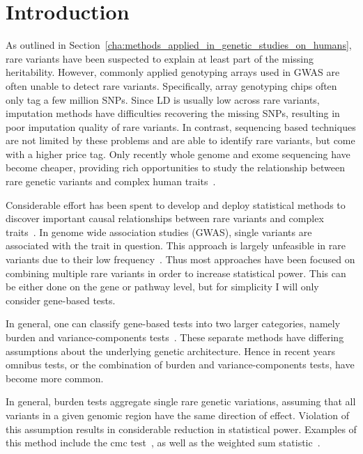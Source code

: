 \section{Introduction}
\label{sec:introduction_ksburden}

As outlined in Section~\ref{cha:methods_applied_in_genetic_studies_on_humans}, rare variants have been suspected to explain at least part of the missing heritability.
However, commonly applied genotyping arrays used in GWAS are often unable to detect rare variants.
Specifically, array genotyping chips often only tag a few million SNPs.
Since LD is usually low across rare variants, imputation methods have difficulties recovering the missing SNPs, resulting in poor imputation quality of rare variants.
In contrast, sequencing based techniques are not limited by these problems and are able to identify rare variants, but come with a higher price tag.
Only recently whole genome and exome sequencing have become cheaper, providing rich opportunities to study the relationship between rare genetic variants and complex human traits~\cite{Goodwin2016}.

Considerable effort has been spent to develop and deploy statistical methods to discover important causal relationships between rare variants and complex traits~\cite{Morris2010,Zeng2014,Daye2012,Manuscript2013}.
In genome wide association studies (GWAS), single variants are associated with the trait in question.
This approach is largely unfeasible in rare variants due to their low frequency~\cite{Lee2014}.
Thus most approaches have been focused on combining multiple rare variants in order to increase statistical power.
This can be either done on the gene or pathway level, but for simplicity I will only consider gene-based tests.

In general, one can classify gene-based tests into two larger categories, namely burden and variance-components tests~\cite{Lee2014}.
These separate methods have differing assumptions about the underlying genetic architecture.
Hence in recent years omnibus tests, or the combination of burden and variance-components tests, have become more common.

In general, burden tests aggregate single rare genetic variations, assuming that all variants in a given genomic region have the same direction of effect.
Violation of this assumption results in considerable reduction in statistical power.
Examples of this method include the \acrfull{cmc} test~\cite{Li2008}, as well as the weighted sum statistic~\cite{Madsen2009}.

